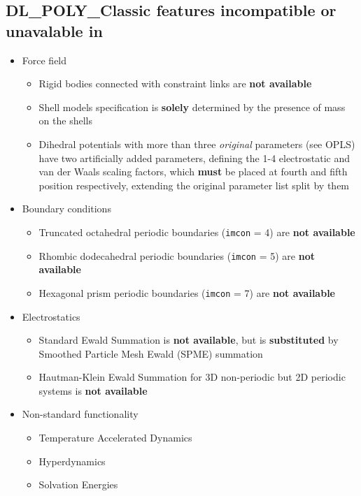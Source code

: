 \subsection{DL\_POLY\_Classic features incompatible or unavalable in \D{}}

\begin{itemize}
\item Force field
\begin{itemize}
\item Rigid bodies connected with constraint links are {\bf not available}
\item Shell models specification is {\bf solely} determined
by the presence of mass on the shells
\item Dihedral potentials with more than three {\em original}
parameters (see OPLS) have two artificially added parameters,
defining the 1-4 electrostatic and van der Waals scaling
factors, which {\bf must} be placed at fourth and fifth position
respectively, extending the original parameter list split by them
\end{itemize}
\item Boundary conditions
\begin{itemize}
\item Truncated octahedral periodic boundaries ({\tt imcon} = 4)
are {\bf not available}
\item Rhombic dodecahedral periodic boundaries ({\tt imcon} = 5)
are {\bf not available}
\item Hexagonal prism periodic boundaries ({\tt imcon} = 7)
are {\bf not available}
\end{itemize}
\item Electrostatics
\begin{itemize}
\item Standard Ewald Summation is {\bf not available}, but is
{\bf substituted} by Smoothed Particle Mesh Ewald (SPME) summation
\item Hautman-Klein Ewald Summation for 3D non-periodic
but 2D periodic systems is {\bf not available}
\end{itemize}
\item Non-standard functionality
\begin{itemize}
\item Temperature Accelerated Dynamics
\item Hyperdynamics
\item Solvation Energies
\end{itemize}
\end{itemize}

